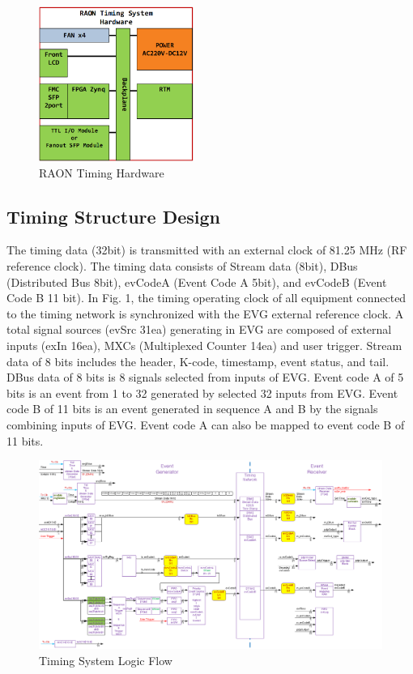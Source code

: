 \documentclass[journal,reqno]{IEEEtran}
\begin{document}
\begin{figure}[!htb]
	\centering
	\includegraphics*[width=0.45\textwidth, height=0.3\textwidth]{img03.png}
	\caption{RAON Timing Hardware}
	\label{timng_hardware}
\end{figure}


\subsection{Timing Structure Design}
The timing data (32bit) is transmitted with an external clock of 81.25 MHz (RF reference clock). The timing data consists of Stream data (8bit), DBus (Distributed Bus 8bit), evCodeA (Event Code A 5bit), and evCodeB (Event Code B 11 bit). In Fig. 1, the timing operating clock of all equipment connected to the timing network is synchronized with the EVG external reference clock. A total signal sources (evSrc 31ea) generating in EVG are composed of external inputs (exIn 16ea), MXCs (Multiplexed Counter 14ea) and user trigger. Stream data of 8 bits includes the header, K-code, timestamp, event status, and tail. DBus data of 8 bits is 8 signals selected from inputs of EVG. Event code A of 5 bits is an event from 1 to 32 generated by selected 32 inputs from EVG. Event code B of 11 bits is an event generated in sequence A and B by the signals combining inputs of EVG. Event code A can also be mapped to event code B of 11 bits.

\begin{figure}[!htb]
	\centering
	\includegraphics*[width=1\textwidth, height=0.5\textwidth]{img1-1.png}
	\caption{Timing System Logic Flow}
	\label{timing_data_structure}
\end{figure}
\end{document}
